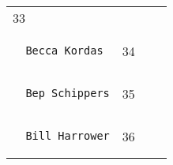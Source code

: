 \documentclass[]{article}
\begin{document}
\begin{longtable}[c]{@{}llll@{}}
\begin{minipage}[t]{0.10\columnwidth}
33
\end{minipage} & \begin{minipage}[t]{0.13\columnwidth}\raggedright
\end{minipage} & \begin{minipage}[t]{0.15\columnwidth}\raggedright
\end{minipage}
\\\noalign{\medskip}
\begin{minipage}[t]{0.39\columnwidth}\raggedright
\begin{verbatim}
  Becca Kordas
\end{verbatim}
\end{minipage} & \begin{minipage}[t]{0.10\columnwidth}\raggedright
34
\end{minipage} & \begin{minipage}[t]{0.13\columnwidth}\raggedright
\end{minipage} & \begin{minipage}[t]{0.15\columnwidth}\raggedright
\end{minipage}
\\\noalign{\medskip}
\begin{minipage}[t]{0.39\columnwidth}\raggedright
\begin{verbatim}
  Bep Schippers
\end{verbatim}
\end{minipage} & \begin{minipage}[t]{0.10\columnwidth}\raggedright
35
\end{minipage} & \begin{minipage}[t]{0.13\columnwidth}\raggedright
\end{minipage} & \begin{minipage}[t]{0.15\columnwidth}\raggedright
\end{minipage}
\\\noalign{\medskip}
\begin{minipage}[t]{0.39\columnwidth}\raggedright
\begin{verbatim}
  Bill Harrower
\end{verbatim}
\end{minipage} & \begin{minipage}[t]{0.10\columnwidth}\raggedright
36
\end{minipage} & \begin{minipage}[t]{0.13\columnwidth}\raggedright
\end{minipage} & \begin{minipage}[t]{0.15\columnwidth}\raggedright

\end{minipage}
\end{longtable}
\end{document}
